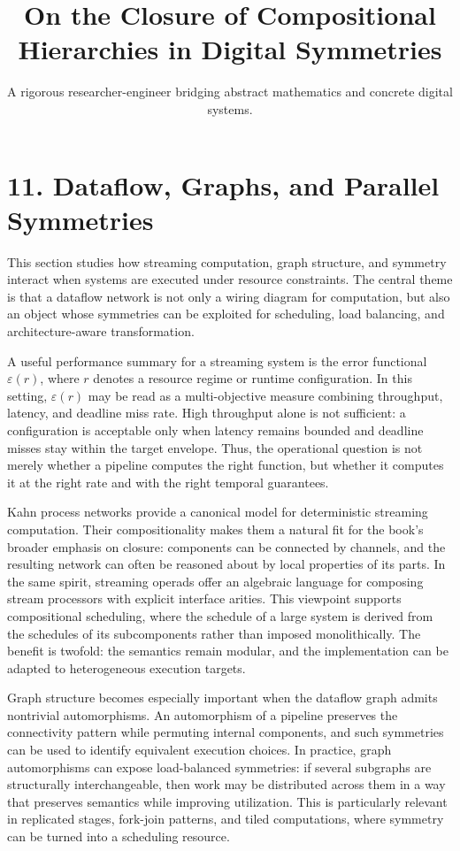 \documentclass[11pt]{article}
\title{On the Closure of Compositional Hierarchies in Digital Symmetries}
\author{A rigorous researcher-engineer bridging abstract mathematics and concrete digital systems.}
\begin{document}
\section*{11. Dataflow, Graphs, and Parallel Symmetries}

This section studies how streaming computation, graph structure, and symmetry interact when systems are executed under resource constraints. The central theme is that a dataflow network is not only a wiring diagram for computation, but also an object whose symmetries can be exploited for scheduling, load balancing, and architecture-aware transformation.

A useful performance summary for a streaming system is the error functional \(\varepsilon(r)\), where \(r\) denotes a resource regime or runtime configuration. In this setting, \(\varepsilon(r)\) may be read as a multi-objective measure combining throughput, latency, and deadline miss rate. High throughput alone is not sufficient: a configuration is acceptable only when latency remains bounded and deadline misses stay within the target envelope. Thus, the operational question is not merely whether a pipeline computes the right function, but whether it computes it at the right rate and with the right temporal guarantees.

Kahn process networks provide a canonical model for deterministic streaming computation. Their compositionality makes them a natural fit for the book's broader emphasis on closure: components can be connected by channels, and the resulting network can often be reasoned about by local properties of its parts. In the same spirit, streaming operads offer an algebraic language for composing stream processors with explicit interface arities. This viewpoint supports compositional scheduling, where the schedule of a large system is derived from the schedules of its subcomponents rather than imposed monolithically. The benefit is twofold: the semantics remain modular, and the implementation can be adapted to heterogeneous execution targets.

Graph structure becomes especially important when the dataflow graph admits nontrivial automorphisms. An automorphism of a pipeline preserves the connectivity pattern while permuting internal components, and such symmetries can be used to identify equivalent execution choices. In practice, graph automorphisms can expose load-balanced symmetries: if several subgraphs are structurally interchangeable, then work may be distributed across them in a way that preserves semantics while improving utilization. This is particularly relevant in replicated stages, fork-join patterns, and tiled computations, where symmetry can be turned into a scheduling resource.
\end{document}

